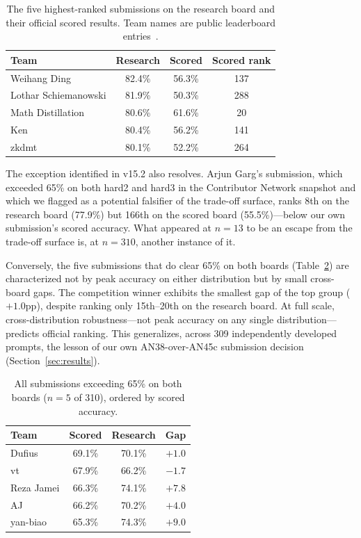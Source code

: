 \begin{table}[t]
\centering
\caption{The five highest-ranked submissions on the research board and
their official scored results. Team names are public leaderboard
entries~\citep{sair2026leaderboard, sair2026leaderboardresearch}.}
\label{tab:researchcollapse}
\begin{tabular}{lccc}
\toprule
Team & Research & Scored & Scored rank \\
\midrule
Weihang Ding & 82.4\% & 56.3\% & 137 \\
Lothar Schiemanowski & 81.9\% & 50.3\% & 288 \\
Math Distillation & 80.6\% & 61.6\% & 20 \\
Ken & 80.4\% & 56.2\% & 141 \\
zkdmt & 80.1\% & 52.2\% & 264 \\
\bottomrule
\end{tabular}
\end{table}

The exception identified in v15.2 also resolves. Arjun Garg's
submission, which exceeded 65\% on both hard2 and hard3 in the
Contributor Network snapshot and which we flagged as a potential
falsifier of the trade-off surface, ranks 8th on the research board
(77.9\%) but 166th on the scored board (55.5\%)---below our own
submission's scored accuracy. What appeared at $n{=}13$ to be an escape
from the trade-off surface is, at $n{=}310$, another instance of it.

Conversely, the five submissions that do clear 65\% on both boards
(Table~\ref{tab:robustfive}) are characterized not by peak accuracy on
either distribution but by small cross-board gaps. The competition
winner exhibits the smallest gap of the top group
($+1.0$pp), despite ranking only 15th--20th on the research board. At
full scale, cross-distribution robustness---not peak accuracy on any
single distribution---predicts official ranking. This generalizes,
across 309 independently developed prompts, the lesson of our own
AN38-over-AN45c submission decision (Section~\ref{sec:results}).

\begin{table}[t]
\centering
\caption{All submissions exceeding 65\% on both boards ($n{=}5$ of
310), ordered by scored accuracy.}
\label{tab:robustfive}
\begin{tabular}{lccc}
\toprule
Team & Scored & Research & Gap \\
\midrule
Dufius & 69.1\% & 70.1\% & $+1.0$ \\
vt & 67.9\% & 66.2\% & $-1.7$ \\
Reza Jamei & 66.3\% & 74.1\% & $+7.8$ \\
AJ & 66.2\% & 70.2\% & $+4.0$ \\
yan-biao & 65.3\% & 74.3\% & $+9.0$ \\
\bottomrule
\end{tabular}
\end{table}

